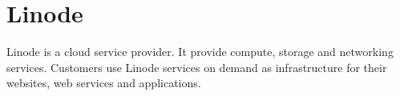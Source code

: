 \section{Linode}

Linode is a cloud service provider. It provide compute, storage and networking services. Customers use Linode services on demand as infrastructure for their websites, web services and applications\cites{hid-sp18-511-linode}.
